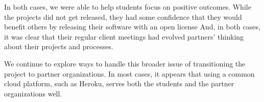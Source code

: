 In both cases, we were able to help students focus on positive
outcomes.  While the projects did not get released, they had some
confidence that they would benefit others by releasing their software
with an open license And, in both cases, it was clear that their
regular client meetings had evolved partners' thinking about their
projects and processes.

We continue to explore ways to handle this broader issue of
transitioning the project to partner organizations.  In most cases,
it appears that using a common cloud platform, such as Heroku,
serves both the students and the partner organizations well.

